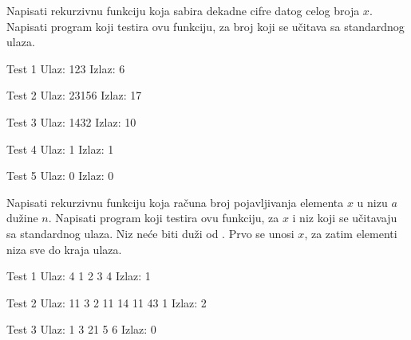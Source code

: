 \begin{Exercise}[label=111]
Napisati rekurzivnu funkciju koja sabira dekadne cifre datog
  celog broja $x$. Napisati program koji testira ovu funkciju, za broj
  koji se učitava sa standardnog ulaza.
  
\begin{minitest}
\begin{test}{Test 1}
Ulaz:    123  
Izlaz:   6 
\end{test}
\end{minitest}
\begin{minitest}
\begin{test}{Test 2}
Ulaz:    23156    
Izlaz:   17 
\end{test}
\end{minitest}
\begin{minitest}
\begin{test}{Test 3}
Ulaz:   1432
Izlaz:   10        
\end{test}
\end{minitest}

\begin{minitest}
\begin{test}{Test 4}
Ulaz:   1       
Izlaz:  1       
\end{test}
\end{minitest}
\begin{minitest}
\begin{test}{Test 5}
Ulaz:   0
Izlaz:  0
\end{test}
\end{minitest}
\end{Exercise}
\begin{Answer}[ref=111]
\end{Answer}


\begin{Exercise}[label=112]
Napisati rekurzivnu funkciju koja računa broj pojavljivanja
  elementa $x$ u nizu $a$ dužine $n$. Napisati program koji testira
  ovu funkciju, za $x$ i niz koji se učitavaju sa standardnog
  ulaza. Niz neće biti duži od . Prvo se unosi $x$, za zatim
  elementi niza sve do kraja ulaza.
  
\begin{minitest}
\begin{test}{Test 1}
Ulaz:    4 1 2 3 4     
Izlaz:   1              
\end{test}
\end{minitest}
\begin{miditest}
\begin{test}{Test 2}
Ulaz:   11 3 2 11 14 11 43 1      
Izlaz:   2                      
\end{test}
\end{miditest}

\begin{minitest}
\begin{test}{Test 3}
Ulaz:  1 3 21 5 6
Izlaz:  0    
\end{test}
\end{minitest}
\end{Exercise}
\begin{Answer}[ref=112]
\end{Answer}



